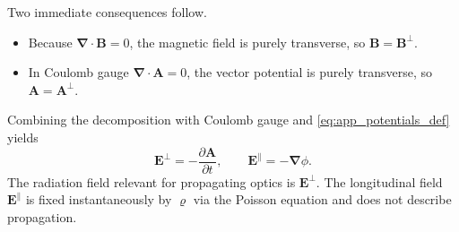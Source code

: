 Two immediate consequences follow.
\begin{itemize}
	\item Because $\boldsymbol{\nabla}\cdot\boldsymbol{B}=0$, the magnetic field is purely transverse, so $\boldsymbol{B}=\boldsymbol{B}^{\perp}$.
	\item In Coulomb gauge $\boldsymbol{\nabla}\cdot\boldsymbol{A}=0$, the vector potential is purely transverse, so $\boldsymbol{A}=\boldsymbol{A}^{\perp}$.
\end{itemize}
Combining the decomposition with Coulomb gauge and \autoref{eq:app_potentials_def} yields
\begin{equation*}
	\boldsymbol{E}^{\perp} = -\frac{\partial \boldsymbol{A}}{\partial t},
	\qquad
	\boldsymbol{E}^{\parallel} = -\boldsymbol{\nabla}\phi.
\end{equation*}
The radiation field relevant for propagating optics is $\boldsymbol{E}^{\perp}$. The longitudinal field $\boldsymbol{E}^{\parallel}$ is fixed instantaneously by $\varrho$ via the Poisson equation and does not describe propagation.

